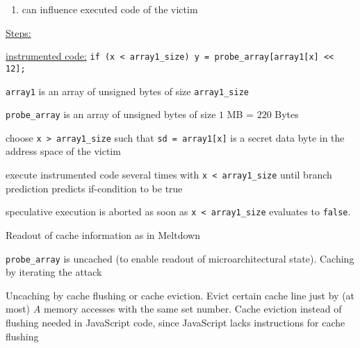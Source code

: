 \documentclass[landscape, a4paper]{article}
\begin{document}
\begin{minipage}[t]{0.2\linewidth}
\begin{betterlist}
\begin{enumerate}
\begin{betterlist}
			\end{betterlist}
			\item can influence executed code of the victim
		\end{enumerate}
		\item \underline{Steps:}
		\begin{betterlist}
			\item \underline{instrumented code:} \verb|if (x < array1_size) y = probe_array[array1[x] << 12];|
			\begin{betterlist}
				\item \verb|array1| is an array of unsigned bytes of size \verb|array1_size|
				\item \verb|probe_array| is an array of unsigned bytes of size $1$ MB = $220$ Bytes
				\item choose \verb|x > array1_size| such that \verb|sd = array1[x]| is a secret data byte in the address space of the victim
				\item execute instrumented code several times with \verb|x < array1_size| until branch prediction predicts if-condition to be true
				\item speculative execution is aborted as soon as \verb|x < array1_size| evaluates to \verb|false|.
			\end{betterlist}
			\item Readout of cache information as in Meltdown
			\begin{betterlist}
				\item \verb|probe_array| is uncached (to enable readout of microarchitectural state). Caching by iterating the attack
				\item Uncaching by cache flushing or cache eviction. Evict certain cache line just by (at most) $A$ memory accesses with the same set number. Cache eviction instead of flushing needed in JavaScript code, since JavaScript lacks instructions for cache flushing

\end{betterlist}
\end{betterlist}
\end{betterlist}
\end{minipage}
\end{document}
